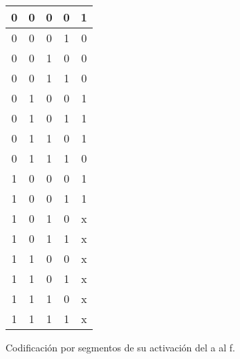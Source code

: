 \begin{figure}[!hbp]
{{\begin{tabular}[b]{|c|c|c|c|c|}
        0&0&0&0&1\\\hline
        0&0&0&1&0\\\hline
        0&0&1&0&0\\\hline
        0&0&1&1&0\\\hline
        0&1&0&0&1\\\hline
        0&1&0&1&1\\\hline
        0&1&1&0&1\\\hline
        0&1&1&1&0\\\hline
        1&0&0&0&1\\\hline
        1&0&0&1&1\\\hline
        1&0&1&0&x\\\hline
        1&0&1&1&x\\\hline
        1&1&0&0&x\\\hline
        1&1&0&1&x\\\hline
        1&1&1&0&x\\\hline
        1&1&1&1&x\\\hline
      \end{tabular}
    }
  }
  \caption{\label{fg:segmentosAaF} Codificación por segmentos de su activación del a al f.}
\end{figure}

